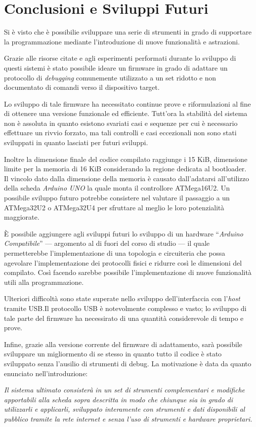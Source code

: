 \chapter*{Conclusioni e Sviluppi Futuri}

Si è visto che è possibilie sviluppare una serie di strumenti in grado di supportare la programmazione mediante l'introduzione di nuove funzionalità e astrazioni.

Grazie alle risorse citate e agli esperimenti performati durante lo sviluppo di questi sistemi è stato possibile ideare un firmware in grado di adattare un protocollo di \textit{debugging} comunemente utilizzato a un set ridotto e non documentato di comandi verso il dispositivo target.

Lo sviluppo di tale firmware ha necessitato continue prove e riformulazioni al fine di ottenere una versione funzionale ed efficiente. Tutt'ora la stabilità del sistema non è assoluta in quanto esistono svariati casi e sequenze per cui è necessario effettuare un rivvio forzato, ma tali controlli e casi eccezionali non sono stati sviluppati in quanto lasciati per futuri sviluppi.

Inoltre la dimensione finale del codice compilato raggiunge i 15 KiB, dimensione limite per la memoria di 16 KiB considerando la regione dedicata al bootloader. Il vincolo dato dalla dimensione della memoria è causato dall'adatarsi all'utilizzo della scheda \textit{Arduino UNO} la quale monta il controllore ATMega16U2. Un possibile sviluppo futuro potrebbe consistere nel valutare il passaggio a un ATMega32U2 o ATMega32U4 per sfruttare al meglio le loro potenzialità maggiorate.

È possibile aggiungere agli sviluppi futuri lo sviluppo di un hardware ``\textit{Arduino Compatibile}'' --- argomento al di fuori del corso di studio --- il quale permetterebbe l'implementazione di una topologia e circuiteria che possa agevolare l'implementazione dei protocolli fisici e ridurre così le dimensioni del compilato.
Così facendo sarebbe possibile l'implementazione di nuove funzionalità utili alla programmazione.

Ulteriori difficoltà sono state superate nello sviluppo dell'interfaccia con l'\textit{host} tramite USB.\@ Il protocollo USB è notevolmente complesso e vasto; lo sviluppo di tale parte del firmware ha necessirato di una quantità considerevole di tempo e prove.

Infine, grazie alla versione corrente del firmware di adattamento, sarà possibile sviluppare un migliormento di se stesso in quanto tutto il codice è stato sviluppato senza l'ausilio di strumenti di debug.
La motivazione è data da quanto enunciato nell'introduzione:
\begin{center}
    \textit{Il sistema ultimato consisterà in un set di strumenti complementari e modifiche apportabili alla scheda sopra descritta in modo che chiunque sia in grado di utilizzarli e applicarli, sviluppato interamente con strumenti e dati disponibili al pubblico tramite la rete internet e senza l'uso di strumenti e hardware proprietari.}
\end{center}

